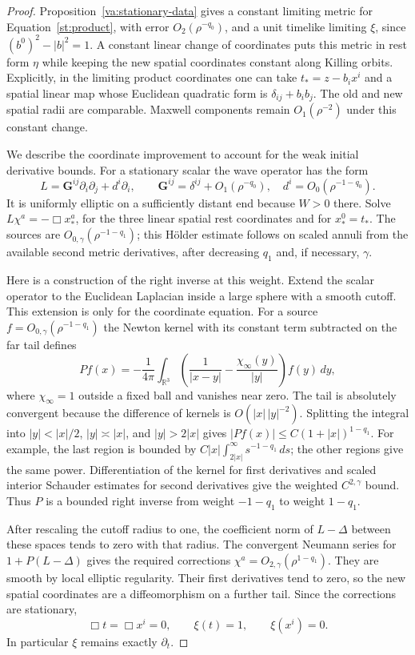 \begin{proof}
Proposition~\ref{va:stationary-data} gives a constant limiting metric
for Equation~\eqref{st:product}, with error $O_2(\rho^{-q_0})$,
and a unit timelike limiting $\xi$, since
$(b^0)^2-|b|^2=1$.  A constant linear change of coordinates puts this
metric in rest form $\eta$ while keeping the new spatial coordinates
constant along Killing orbits.  Explicitly, in the limiting product
coordinates one can take $t_*=z-b_i x^i$ and a spatial linear map
whose Euclidean quadratic form is $\delta_{ij}+b_i b_j$.  The old
and new spatial radii are comparable.  Maxwell components remain
$O_1(\rho^{-2})$ under this constant change.

We describe the coordinate improvement to account for the weak initial
derivative bounds.  For a stationary scalar the wave operator has the
form
\[
 L=\mathbf G^{ij}\partial_i\partial_j+d^i\partial_i,
 \qquad
 \mathbf G^{ij}=\delta^{ij}+O_1(\rho^{-q_0}),\quad
 d^i=O_0(\rho^{-1-q_0}).
\]
It is uniformly elliptic on a sufficiently distant end because $W>0$
there.  Solve $L\chi^a=-\boldsymbol\Box x_*^a$, for the three
linear spatial rest coordinates and for $x_*^0=t_*$.  The sources
are $O_{0,\gamma}(\rho^{-1-q_1})$; this H\"older estimate follows
on scaled annuli from the available second metric derivatives, after
decreasing $q_1$ and, if necessary, $\gamma$.

Here is a construction of the right inverse at this weight.  Extend
the scalar operator to the Euclidean Laplacian inside a large sphere
with a smooth cutoff.  This extension is only for the coordinate
equation.  For a source $f=O_{0,\gamma}(\rho^{-1-q_1})$ the Newton
kernel with its constant term subtracted on the far tail defines
\[
 P f(x)=-\frac1{4\pi}\int_{\mathbb R^3}
 \left(\frac1{|x-y|}-\frac{\chi_\infty(y)}{|y|}\right)f(y)\,dy,
\]
where $\chi_\infty=1$ outside a fixed ball and vanishes near zero.
The tail is absolutely convergent because the difference of kernels
is $O(|x|\,|y|^{-2})$.  Splitting the integral into
$|y|<|x|/2$, $|y|\asymp |x|$, and $|y|>2|x|$ gives
$|Pf(x)|\leq C(1+|x|)^{1-q_1}$.  For example, the last region is
bounded by
$C|x|\int_{2|x|}^{\infty}s^{-1-q_1}\,ds$; the other regions
give the same power.  Differentiation of the kernel for first
derivatives and scaled interior Schauder estimates for second
derivatives give the weighted $C^{2,\gamma}$ bound.  Thus $P$ is a
bounded right inverse from weight $-1-q_1$ to weight $1-q_1$.

After rescaling the cutoff radius to one, the coefficient norm of
$L-\Delta$ between these spaces tends to zero with that radius.
The convergent Neumann series for $1+P(L-\Delta)$ gives the required
corrections $\chi^a=O_{2,\gamma}(\rho^{1-q_1})$.  They are smooth
by local elliptic regularity.  Their first derivatives tend to zero,
so the new spatial coordinates are a diffeomorphism on a further
tail.  Since the corrections are stationary,
\[
 \boldsymbol\Box t=\boldsymbol\Box x^i=0,
 \qquad \xi(t)=1,\qquad \xi(x^i)=0.
\]
In particular $\xi$ remains exactly $\partial_t$.


\end{proof}
